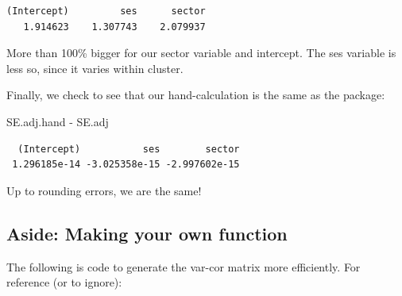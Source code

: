 \documentclass[
  letterpaper,
  DIV=11,
  numbers=noendperiod]{scrreprt}
\newenvironment{Shaded}{\begin{snugshade}}{\end{snugshade}}
\newcommand{\AttributeTok}[1]{\textcolor[rgb]{0.49,0.56,0.16}{#1}}
\newcommand{\ControlFlowTok}[1]{\textcolor[rgb]{0.00,0.44,0.13}{\textbf{#1}}}
\newcommand{\DecValTok}[1]{\textcolor[rgb]{0.25,0.63,0.44}{#1}}
\newcommand{\FunctionTok}[1]{\textcolor[rgb]{0.02,0.16,0.49}{#1}}
\newcommand{\NormalTok}[1]{\textcolor[rgb]{0.00,0.44,0.13}{#1}}
\newcommand{\OtherTok}[1]{\textcolor[rgb]{0.00,0.44,0.13}{#1}}
\newcommand{\SpecialCharTok}[1]{\textcolor[rgb]{0.25,0.44,0.63}{#1}}
\begin{document}
\begin{verbatim}
(Intercept)         ses      sector 
   1.914623    1.307743    2.079937 
\end{verbatim}

More than 100\% bigger for our sector variable and intercept. The ses
variable is less so, since it varies within cluster.

Finally, we check to see that our hand-calculation is the same as the
package:

\begin{Shaded}
\begin{Highlighting}[]
\NormalTok{SE.adj.hand }\SpecialCharTok{{-}}\NormalTok{ SE.adj}
\end{Highlighting}
\end{Shaded}

\begin{verbatim}
  (Intercept)           ses        sector 
 1.296185e-14 -3.025358e-15 -2.997602e-15 
\end{verbatim}

Up to rounding errors, we are the same!

\hypertarget{aside-making-your-own-function}{%
\subsection{Aside: Making your own
function}\label{aside-making-your-own-function}}

The following is code to generate the var-cor matrix more efficiently.
For reference (or to ignore):

\begin{Shaded}
\end{Shaded}
\end{document}
